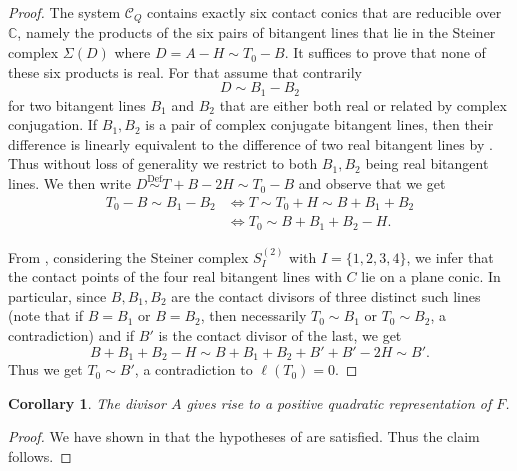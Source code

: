 \documentclass[a4paper,10pt]{amsart}
\theoremstyle{definition}
\theoremstyle{plain}
\newtheorem{cor}[Def]{Corollary}
\newcommand{\cC}{{\mathcal C}}
\newcommand{\C}{{\mathbb C}}
\begin{document}
\begin{proof}
    The system $\cC_Q$ contains exactly six contact conics that are reducible over $\C$, namely the products of the six pairs of bitangent lines that lie in the Steiner complex $\Sigma(D)$ where $D = A -H \sim T_0 - B$. It suffices to prove that none of these six products is real. For that assume that contrarily
    \begin{equation*}
        D \sim B_1 - B_2
    \end{equation*}
    for two bitangent lines $B_1$ and $B_2$ that are either both real or related by complex conjugation. If $B_1, B_2$ is a pair of complex conjugate bitangent lines, then their difference is linearly equivalent to the difference of two real bitangent lines by . Thus without loss of generality we restrict to both $B_1, B_2$ being real bitangent lines.     
    We then write $D \overset{\text{Def}}{\sim} T + B - 2H \sim T_0 - B$ and observe that we get
    \begin{align*}
        T_0 - B \sim B_1 - B_2 &\iff T \sim T_0 + H \sim B + B_1 + B_2 \\
        &\iff T_0 \sim B + B_1 + B_2 - H.
    \end{align*}
    
    From , considering the Steiner complex $S^{(2)}_I$ with $I = \{1,2,3,4\}$, we infer that the contact points of the four real bitangent lines with $C$ lie on a plane conic. In particular, since $B, B_1, B_2$ are the contact divisors of three distinct such lines (note that if $B = B_1$ or $B = B_2$, then necessarily $T_0 \sim B_1$ or $T_0 \sim B_2$, a contradiction) and if $B'$ is the contact divisor of the last, we get
    \begin{equation*}
        B + B_1 + B_2 - H \sim B + B_1 + B_2 + B' + B' - 2H \sim B'.
    \end{equation*}
    Thus we get $T_0 \sim B'$, a contradiction to $\ell(T_0) = 0$.
\end{proof}

\begin{cor}
    The divisor $A$ gives rise to a positive quadratic representation of $F$.
\end{cor}

\begin{proof}
    We have shown in  that the hypotheses of  are satisfied. Thus the claim follows.
\end{proof}
\end{document}
